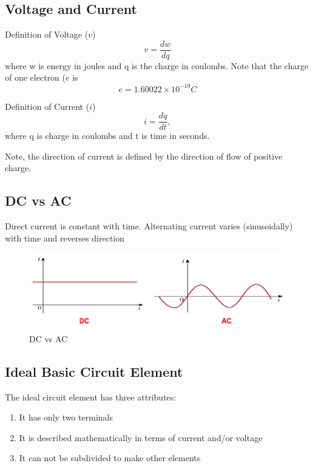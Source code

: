 \documentclass[14pt]{memoir}
\begin{document}
\subsection{Voltage and Current}

Definition of Voltage ($v$)
\begin{equation}
v = \frac{dw}{dq}
\end{equation}
where w is energy in joules and q is the charge in coulombs. Note that the charge of one electron ($e$ is
\begin{equation}
e = 1.60022 \times 10^{-19} C
\end{equation}

Definition of Current ($i$)
\begin{equation}
i = \frac{dq}{dt},
\end{equation}
where q is charge in coulombs and t is time in seconds.

Note, the direction of current is defined by the direction of flow of positive charge. 

\subsection{DC vs AC}

Direct current is constant with time.
Alternating current varies (sinusoidally) with time and reverses direction

\begin{figure}[h]
\begin{center}
\includegraphics[scale=0.40]{fig/fig01_04a.png}
\caption{DC vs AC}
\label{fig:f01_04a}
\end{center}
\end{figure}

\subsection{Ideal Basic Circuit Element}

The ideal circuit element has three attributes:
\begin{enumerate}
\item It has only two terminals
\item It is described mathematically in terms of current and/or voltage
\item It can not be subdivided to make other elements
\end{enumerate}
\end{document}
